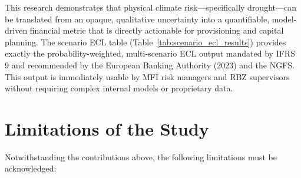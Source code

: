 \documentclass[12pt,a4paper]{article}
\begin{document}
This research demonstrates that physical climate risk---specifically drought---can be translated from an opaque, qualitative uncertainty into a quantifiable, model-driven financial metric that is directly actionable for provisioning and capital planning. The scenario ECL table (Table~\ref{tab:scenario_ecl_results}) provides exactly the probability-weighted, multi-scenario ECL output mandated by IFRS 9 and recommended by the European Banking Authority (2023) and the NGFS. This output is immediately usable by MFI risk managers and RBZ supervisors without requiring complex internal models or proprietary data.

\section{Limitations of the Study}

Notwithstanding the contributions above, the following limitations must be acknowledged:
\end{document}
